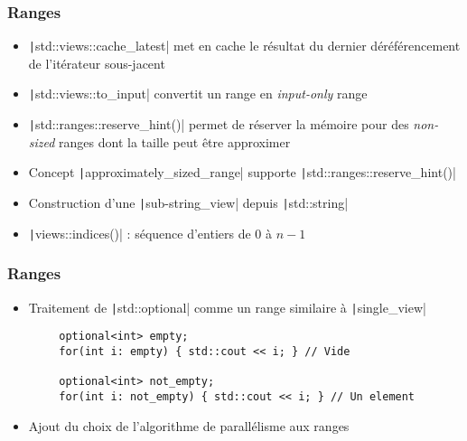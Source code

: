 \documentclass[C++.tex]{subfiles}
\begin{document}
\begin{frame}[fragile]
	\frametitle{Ranges}
	\begin{itemize}
		\item \texttt|std::views::cache_latest| met en cache le résultat du dernier déréférencement de l'itérateur sous-jacent
		\item \texttt|std::views::to_input| convertit un range en \textit{input-only} range
		\item \texttt|std::ranges::reserve_hint()| permet de réserver la mémoire pour des \textit{non-sized} ranges dont la taille peut être approximer
		\item Concept \texttt|approximately_sized_range| supporte \texttt|std::ranges::reserve_hint()|
		\item Construction d'une \texttt|sub-string_view| depuis \texttt|std::string|
		\item \texttt|views::indices()| : séquence d'entiers de 0 à $n - 1$
	\end{itemize}

\end{frame}

\begin{frame}[fragile]
	\frametitle{Ranges}
	\begin{itemize}
		\item Traitement de \texttt|std::optional| comme un range similaire à \texttt|single_view|
	\end{itemize}

	\begin{verbatim}
		optional<int> empty;
		for(int i: empty) { std::cout << i; } // Vide

		optional<int> not_empty;
		for(int i: not_empty) { std::cout << i; } // Un element
	\end{verbatim}

	\begin{itemize}
		\item Ajout du choix de l'algorithme de parallélisme aux ranges
	\end{itemize}

\end{frame}
\end{document}
